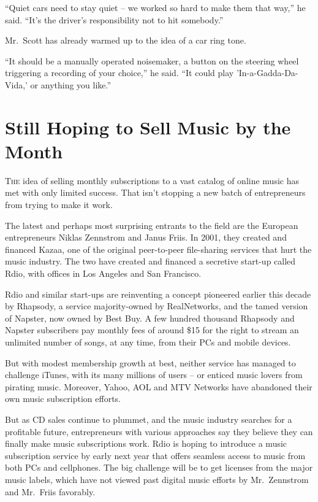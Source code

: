 ﻿\documentclass[12pt]{article}
\begin{document}
``Quiet cars need to stay quiet -- we worked so hard to make them that way,'' he said. ``It's the
driver's responsibility not to hit somebody.''

Mr.~Scott has already warmed up to the idea of a car ring tone.

``It should be a manually operated noisemaker, a button on the steering wheel triggering a recording
of your choice,'' he said. ``It could play 'In-a-Gadda-Da-Vida,' or anything you like.''

\section{Still Hoping to Sell Music by the Month}

\lettrine{T}{he} idea of selling monthly subscriptions to a vast catalog of
online music has met with only limited success. That isn't stopping a new batch of entrepreneurs
from trying to make it work.

The latest and perhaps most surprising entrants to the field are the European entrepreneurs Niklas
Zennstrom and Janus Friis. In 2001, they created and financed Kazaa, one of the original
peer-to-peer file-sharing services that hurt the music industry. The two have created and financed a
secretive start-up called Rdio, with offices in Los Angeles and San Francisco.

Rdio and similar start-ups are reinventing a concept pioneered earlier this decade by Rhapsody, a
service majority-owned by RealNetworks, and the tamed version of Napster, now owned by Best Buy. A
few hundred thousand Rhapsody and Napster subscribers pay monthly fees of around \$15 for the right
to stream an unlimited number of songs, at any time, from their PCs and mobile devices.

But with modest membership growth at best, neither service has managed to challenge iTunes, with its
many millions of users -- or enticed music lovers from pirating music. Moreover, Yahoo, AOL and MTV
Networks have abandoned their own music subscription efforts.

But as CD sales continue to plummet, and the music industry searches for a profitable future,
entrepreneurs with various approaches say they believe they can finally make music subscriptions
work. Rdio is hoping to introduce a music subscription service by early next year that offers
seamless access to music from both PCs and cellphones. The big challenge will be to get licenses
from the major music labels, which have not viewed past digital music efforts by Mr.~Zennstrom and
Mr.~Friis favorably.
\end{document}
